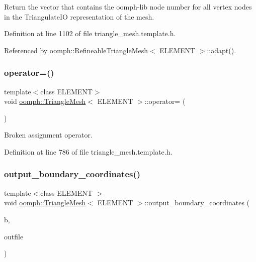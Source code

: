 Return the vector that contains the oomph-\/lib node number for all vertex nodes in the Triangulate\+IO representation of the mesh. 



Definition at line 1102 of file triangle\+\_\+mesh.\+template.\+h.



Referenced by oomph\+::\+Refineable\+Triangle\+Mesh$<$ E\+L\+E\+M\+E\+N\+T $>$\+::adapt().

\mbox{\label{classoomph_1_1TriangleMesh_a246acfb459ba11cc8b21132ace403e3c}} 
\subsubsection{\texorpdfstring{operator=()}{operator=()}}
{\footnotesize\ttfamily template$<$class E\+L\+E\+M\+E\+NT$>$ \\
void \hyperlink{classoomph_1_1TriangleMesh}{oomph\+::\+Triangle\+Mesh}$<$ E\+L\+E\+M\+E\+NT $>$\+::operator= (\begin{DoxyParamCaption}\item[{const \hyperlink{classoomph_1_1TriangleMesh}{Triangle\+Mesh}$<$ E\+L\+E\+M\+E\+NT $>$ \&}]{ }\end{DoxyParamCaption})\hspace{0.3cm}{\ttfamily [inline]}}



Broken assignment operator. 



Definition at line 786 of file triangle\+\_\+mesh.\+template.\+h.

\mbox{\label{classoomph_1_1TriangleMesh_ac7ea71980a3512c16a4ead623988a1e8}} 
\subsubsection{\texorpdfstring{output\+\_\+boundary\+\_\+coordinates()}{output\_boundary\_coordinates()}}
{\footnotesize\ttfamily template$<$class E\+L\+E\+M\+E\+NT $>$ \\
void \hyperlink{classoomph_1_1TriangleMesh}{oomph\+::\+Triangle\+Mesh}$<$ E\+L\+E\+M\+E\+NT $>$\+::output\+\_\+boundary\+\_\+coordinates (\begin{DoxyParamCaption}\item[{const unsigned \&}]{b,  }\item[{std\+::ostream \&}]{outfile }\end{DoxyParamCaption})}

